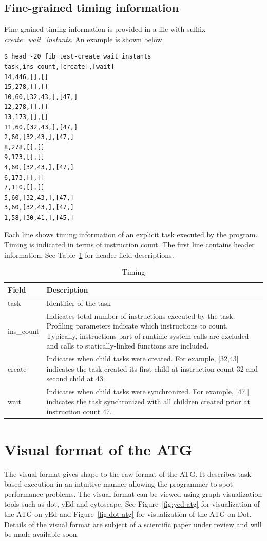 \documentclass[11pt,a4paper,notitlepage]{article}
\begin{document}
\subsection{Fine-grained timing information}
Fine-grained timing information is provided in a file with sufffix \textit{create\_wait\_instants}.
An example is shown below.

\begin{lstlisting}[style=BashInputStyle]
$ head -20 fib_test-create_wait_instants 
task,ins_count,[create],[wait]
14,446,[],[]
15,278,[],[]
10,60,[32,43,],[47,]
12,278,[],[]
13,173,[],[]
11,60,[32,43,],[47,]
2,60,[32,43,],[47,]
8,278,[],[]
9,173,[],[]
4,60,[32,43,],[47,]
6,173,[],[]
7,110,[],[]
5,60,[32,43,],[47,]
3,60,[32,43,],[47,]
1,58,[30,41,],[45,]
\end{lstlisting}

Each line shows timing information of an explicit task executed by the program.
Timing is indicated in terms of instruction count.
The first line contains header information. 
See Table~\ref{tab:timing} for header field descriptions.

\begin{table}[!htb]
\begin{tabular}{|p{2.5cm}|p{10cm}|}
\hline
\textbf{Field} & \textbf{Description} \\ \hline
task & Identifier of the task \\ \hline
ins\_count & Indicates total number of instructions executed by the task. Profiling parameters indicate which instructions to count. Typically, instructions part of runtime system calls are excluded and calls to statically-linked functions are included.  \\ \hline
create & Indicates when child tasks were created. For example, [32,43] indicates the task created its first child at instruction count 32 and second child at 43. \\ \hline
wait & Indicates when child tasks were synchronized. For example, [47,] indicates the task synchronized with all children created prior at instruction count 47. \\ \hline
\end{tabular}
\caption{Timing}
\label{tab:timing}
\end{table}

\section{Visual format of the ATG}
The visual format gives shape to the raw format of the ATG.
It describes task-based execution in an intuitive manner allowing the programmer to spot performance problems.
The visual format can be viewed using graph visualization tools such as dot, yEd and cytoscape.
See Figure~\ref{fig:yed-atg} for visualization of the ATG on yEd and Figure~\ref{fig:dot-atg} for visualization of the ATG on Dot.
Details of the visual format are subject of a scientific paper under review and will be made available soon.
\end{document}
